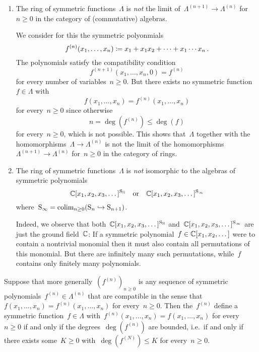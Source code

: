 \documentclass[a4paper,11pt]{scrartcl}
\begin{document}
\begin{warning}
  \leavevmode
  \begin{enumerate}
    \item
      The ring of symmetric functions~$\Lambda$ is \emph{not} the limit of~$\Lambda^{(n+1)} \to \Lambda^{(n)}$ for~$n \geq 0$ in the category of (commutative) algebras.

      We consider for this the symmetric polyonmials
      \[
        f^{ (n) }(x_1, \dotsc, x_n)
        \coloneqq
        x_1 + x_1 x_2 + \dotsb + x_1 \dotsm x_n \,.
      \]
      The polynomials satisfy the compatibility condition
      \[
        f^{(n+1)}(x_1, \dotsc, x_n, 0)
        =
        f^{(n)}
      \]
      for every number of variables~$n \geq 0$.
      But there exists no symmetric function~$f \in \Lambda$ with
      \[
        f(x_1, \dotsc, x_n) = f^{(n)}(x_1, \dotsc, x_n)
      \]
      for every~$n \geq 0$ since otherwise
      \[
        n
        =
        \deg(f^{(n)})
        \leq
        \deg(f)
      \]
      for every~$n \geq 0$, which is not possible.
      This shows that~$\Lambda$ together with the homomorphisms~$\Lambda \to \Lambda^{(n)}$ is not the limit of the homomorphisms~$\Lambda^{(n+1)} \to \Lambda^{(n)}$ for~$n \geq 0$ in the category of rings.
    \item
      The ring of symmetric functions~$\Lambda$ is \emph{not} isomorphic to the algebras of symmetric polynomials
      \[
        \mathbb{C}[x_1, x_2, x_3, \dotsc]^{\mathrm{S}_{\mathbb{N}}}
        \quad\text{or}\quad
        \mathbb{C}[x_1, x_2, x_3, \dotsc]^{\mathrm{S}_\infty}
      \]
      where~$\mathrm{S}_\infty = \operatorname*{colim}_{n \geq 0} (\mathrm{S}_n \hookrightarrow \mathrm{S}_{n+1})$.

      Indeed, we observe that both~$\mathbb{C}[x_1, x_2, x_3, \dotsc]^{\mathrm{S}_{\mathbb{N}}}$ and~$\mathbb{C}[x_1, x_2, x_3, \dotsc]^{\mathrm{S}_\infty}$ are just the ground field~$\mathbb{C}$:
      If a symmetric polynomial~$f \in \mathbb{C}[x_1, x_2, \dotsc]$ were to contain a nontrivial monomial then it must also contain all permutations of this monomial.
      But there are infinitely many such permutations, while~$f$ contains only finitely many polynomials.
  \end{enumerate}
\end{warning}

Suppose that more generally~$( f^{(n)} )_{n \geq 0}$ is any sequence of symmetric polynomials~$f^{(n)} \in \Lambda^{(n)}$ that are compatible in the sense that~$f(x_1, \dotsc, x_n) = f^{(n)}(x_1, \dotsc, x_n)$ for every~$n \geq 0$.
Then the~$f^{(n)}$ define a symmetric function~$f \in \Lambda$ with~$f^{(n)}(x_1, \dotsc, x_n) = f(x_1, \dotsc, x_n)$ for every~$n \geq 0$ if and only if the degrees~$\deg( f^{(n)} )$ are bounded, i.e.\ if and only if there exists some~$K \geq 0$ with~$\deg( f^{(N)} ) \leq K$ for every~$n \geq 0$.
\end{document}
